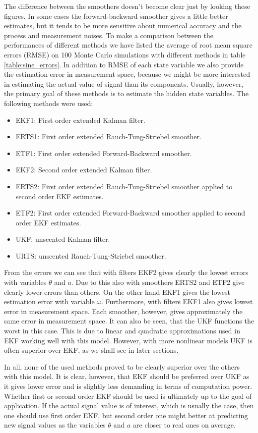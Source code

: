 The difference between the smoothers doesn't become clear just by
looking these figures. In some cases the forward-backward smoother
gives a little better estimates, but it tends to be more sensitive
about numerical accuracy and the process and measurement noises. To
make a comparison between the performances of different methods we
have listed the average of root mean square errors (RMSE) on 100 Monte
Carlo simulations with different methods in table
\ref{table:sine_errors}.  In addition to RMSE of each state variable
we also provide the estimation error in measurement space, because we
might be more interested in estimating the actual value of signal than
its components.  Usually, however, the primary goal of these methods
is to estimate the hidden state variables. The following methods were
used:
%
\begin{itemize}
\item EKF1: First order extended Kalman filter.
\item ERTS1: First order extended Rauch-Tung-Striebel smoother.
\item ETF1: First order extended Forward-Backward smoother.
\item EKF2: Second order extended Kalman filter.
\item ERTS2: First order extended Rauch-Tung-Striebel smoother applied
to second order EKF estimates.
\item ETF2: First order extended Forward-Backward smoother applied to
second order EKF estimates.
\item UKF: unscented Kalman filter.
\item URTS: unscented Rauch-Tung-Striebel smoother.
\end{itemize}
%
From the errors we can see that with filters EKF2 gives clearly the
lowest errors with variables $\theta$ and $a$. Due to this also with
smoothers ERTS2 and ETF2 give clearly lower errors than others. On the
other hand EKF1 gives the lowest estimation error with variable
$\omega$. Furthermore, with filters EKF1 also gives lowest error in
measurement space. Each smoother, however, gives approximately the
same error in measurement space. It can also be seen, that the UKF
functions the worst in this case. This is due to linear and quadratic
approximations used in EKF working well with this model. However, with
more nonlinear models UKF is often superior over EKF, as we shall see
in later sections.

In all, none of the used methods proved to be clearly superior over
the others with this model. It is clear, however, that EKF should be
preferred over UKF as it gives lower error and is slightly less
demanding in terms of computation power.  Whether first or second
order EKF should be used is ultimately up to the goal of
application. If the actual signal value is of interest, which is
usually the case, then one should use first order EKF, but second
order one might better at predicting new signal values as the
variables $\theta$ and $a$ are closer to real ones on average.


